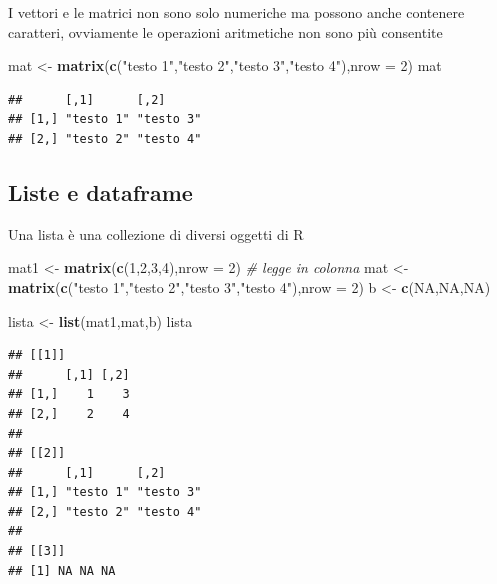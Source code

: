 \documentclass[
  11pt,
]{book}
\newenvironment{Shaded}{\begin{snugshade}}{\end{snugshade}}
\newcommand{\AttributeTok}[1]{\textcolor[rgb]{0.13,0.29,0.53}{#1}}
\newcommand{\CommentTok}[1]{\textcolor[rgb]{0.56,0.35,0.01}{\textit{#1}}}
\newcommand{\ConstantTok}[1]{\textcolor[rgb]{0.56,0.35,0.01}{#1}}
\newcommand{\DecValTok}[1]{\textcolor[rgb]{0.00,0.00,0.81}{#1}}
\newcommand{\FunctionTok}[1]{\textcolor[rgb]{0.13,0.29,0.53}{\textbf{#1}}}
\newcommand{\NormalTok}[1]{#1}
\newcommand{\OtherTok}[1]{\textcolor[rgb]{0.56,0.35,0.01}{#1}}
\newcommand{\StringTok}[1]{\textcolor[rgb]{0.31,0.60,0.02}{#1}}
\theoremstyle{mytheoremstyle}
\theoremstyle{mydefstyle}
\begin{document}
I vettori e le matrici non sono solo numeriche ma possono anche contenere
caratteri, ovviamente le operazioni aritmetiche non sono più consentite

\begin{Shaded}
\begin{Highlighting}[]
\NormalTok{mat }\OtherTok{\textless{}{-}} \FunctionTok{matrix}\NormalTok{(}\FunctionTok{c}\NormalTok{(}\StringTok{"testo 1"}\NormalTok{,}\StringTok{"testo 2"}\NormalTok{,}\StringTok{"testo 3"}\NormalTok{,}\StringTok{"testo 4"}\NormalTok{),}\AttributeTok{nrow =} \DecValTok{2}\NormalTok{) }
\NormalTok{mat}
\end{Highlighting}
\end{Shaded}

\begin{verbatim}
##      [,1]      [,2]     
## [1,] "testo 1" "testo 3"
## [2,] "testo 2" "testo 4"
\end{verbatim}

\subsection{Liste e dataframe}\label{liste-e-dataframe}

Una lista è una collezione di diversi oggetti di R

\begin{Shaded}
\begin{Highlighting}[]
\NormalTok{mat1 }\OtherTok{\textless{}{-}} \FunctionTok{matrix}\NormalTok{(}\FunctionTok{c}\NormalTok{(}\DecValTok{1}\NormalTok{,}\DecValTok{2}\NormalTok{,}\DecValTok{3}\NormalTok{,}\DecValTok{4}\NormalTok{),}\AttributeTok{nrow =} \DecValTok{2}\NormalTok{) }\CommentTok{\# legge in colonna}
\NormalTok{mat }\OtherTok{\textless{}{-}} \FunctionTok{matrix}\NormalTok{(}\FunctionTok{c}\NormalTok{(}\StringTok{"testo 1"}\NormalTok{,}\StringTok{"testo 2"}\NormalTok{,}\StringTok{"testo 3"}\NormalTok{,}\StringTok{"testo 4"}\NormalTok{),}\AttributeTok{nrow =} \DecValTok{2}\NormalTok{) }
\NormalTok{b }\OtherTok{\textless{}{-}} \FunctionTok{c}\NormalTok{(}\ConstantTok{NA}\NormalTok{,}\ConstantTok{NA}\NormalTok{,}\ConstantTok{NA}\NormalTok{)}

\NormalTok{lista }\OtherTok{\textless{}{-}} \FunctionTok{list}\NormalTok{(mat1,mat,b)}
\NormalTok{lista}
\end{Highlighting}
\end{Shaded}

\begin{verbatim}
## [[1]]
##      [,1] [,2]
## [1,]    1    3
## [2,]    2    4
## 
## [[2]]
##      [,1]      [,2]     
## [1,] "testo 1" "testo 3"
## [2,] "testo 2" "testo 4"
## 
## [[3]]
## [1] NA NA NA
\end{verbatim}
\end{document}

